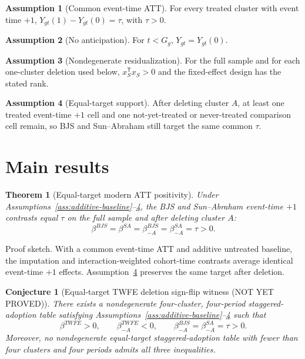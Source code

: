 \documentclass[11pt]{article}
\newcommand{\transpose}{\mathsf{T}}
\theoremstyle{definition}
\newtheorem{assumption}{Assumption}
\theoremstyle{plain}
\newtheorem{theorem}{Theorem}
\newtheorem{conjecture}{Conjecture}
\theoremstyle{remark}
\begin{document}
\begin{assumption}[Common event-time ATT]\label{ass:common-att}
For every treated cluster with event time \(+1\), \(Y_{gt}(1)-Y_{gt}(0)=\tau\), with \(\tau>0\).
\end{assumption}

\begin{assumption}[No anticipation]\label{ass:no-anticipation}
For \(t<G_g\), \(Y_{gt}=Y_{gt}(0)\).
\end{assumption}

\begin{assumption}[Nondegenerate residualization]\label{ass:nondegenerate}
For the full sample and for each one-cluster deletion used below, \(x_S^\transpose x_S>0\) and the fixed-effect design has the stated rank.
\end{assumption}

\begin{assumption}[Equal-target support]\label{ass:equal-target-support}
After deleting cluster \(A\), at least one treated event-time \(+1\) cell and one not-yet-treated or never-treated comparison cell remain, so BJS and Sun--Abraham still target the same common \(\tau\).
\end{assumption}

\section{Main results}
\begin{theorem}[Equal-target modern ATT positivity]
Under Assumptions~\ref{ass:additive-baseline}--\ref{ass:equal-target-support}, the BJS and Sun--Abraham event-time \(+1\) contrasts equal \(\tau\) on the full sample and after deleting cluster \(A\):
\[
\beta^{BJS}=\beta^{SA}=\beta^{BJS}_{-A}=\beta^{SA}_{-A}=\tau>0.
\]
\end{theorem}
Proof sketch.  With a common event-time ATT and additive untreated baseline, the imputation and interaction-weighted cohort-time contrasts average identical event-time \(+1\) effects.  Assumption~\ref{ass:equal-target-support} preserves the same target after deletion.

\begin{conjecture}[Equal-target TWFE deletion sign-flip witness (NOT YET PROVED)]
There exists a nondegenerate four-cluster, four-period staggered-adoption table satisfying Assumptions~\ref{ass:additive-baseline}--\ref{ass:equal-target-support} such that
\[
\beta^{TWFE}>0,\qquad \beta^{TWFE}_{-A}<0,\qquad
\beta^{BJS}_{-A}=\beta^{SA}_{-A}=\tau>0.
\]
Moreover, no nondegenerate equal-target staggered-adoption table with fewer than four clusters and four periods admits all three inequalities.
\end{conjecture}
\end{document}
